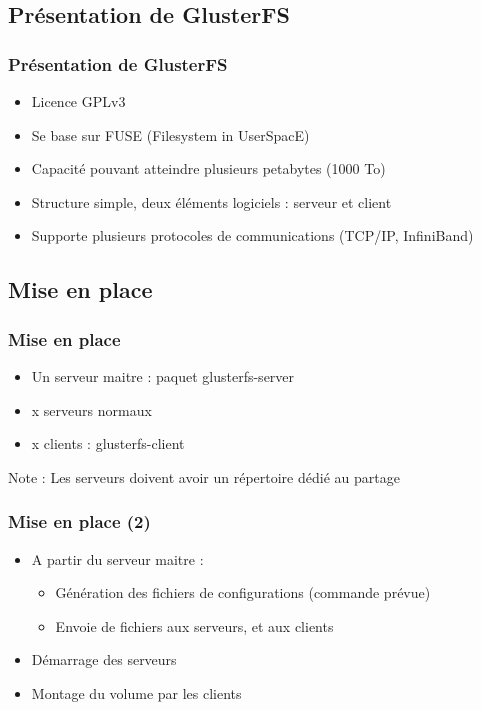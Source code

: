 \documentclass[blue]{beamer}
\begin{document}
	\subsection{Présentation de GlusterFS}
	\begin{frame}
		\frametitle{Présentation de GlusterFS}
		\begin{itemize}
			\item Licence GPLv3
			\item Se base sur FUSE (Filesystem in UserSpacE)
			\item Capacité pouvant atteindre plusieurs petabytes (1000 To)
			\item Structure simple, deux éléments logiciels : serveur et client
			\item Supporte plusieurs protocoles de communications (TCP/IP, InfiniBand)
		\end{itemize}
	\end{frame}
	
	\subsection{Mise en place}
	\begin{frame}
		\frametitle{Mise en place}
		\begin{itemize}
			\item Un serveur maitre : paquet glusterfs-server
			\item x serveurs \og normaux\fg
			\item x clients : glusterfs-client
		\end{itemize}

		\begin{block}{Note :}
			Les serveurs doivent avoir un répertoire dédié au partage
		\end{block}
	\end{frame}

	\begin{frame}
		\frametitle{Mise en place (2)}
			\begin{itemize}
				\item A partir du serveur maitre :
				\begin{itemize}
					\item Génération des fichiers de configurations (commande prévue)
					\item Envoie de fichiers aux serveurs, et aux clients
				\end{itemize}
				\item Démarrage des serveurs
				\item Montage du volume par les clients
			\end{itemize}
	\end{frame}
\end{document}
